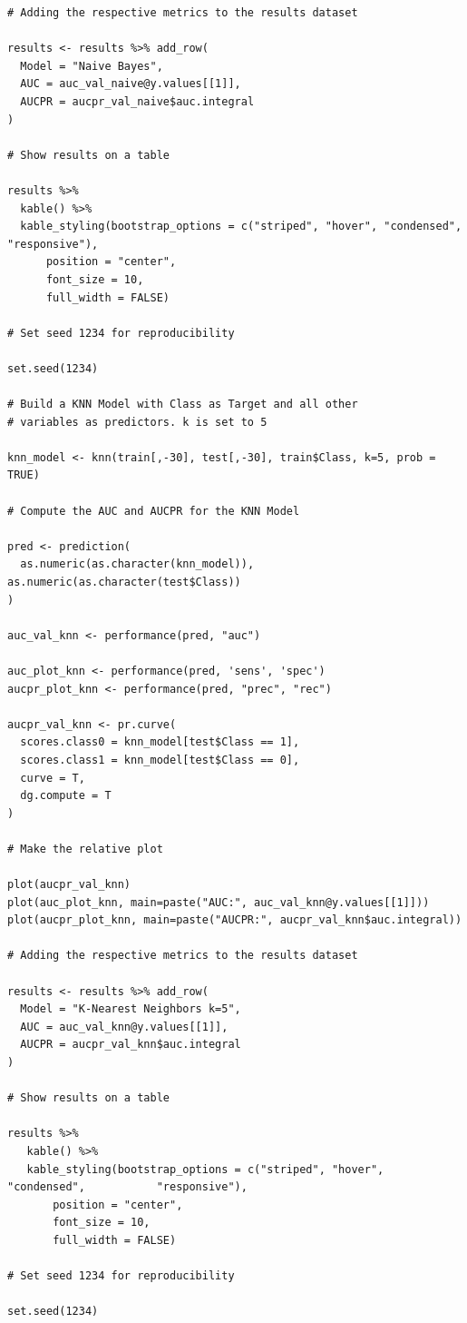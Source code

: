 \documentclass[]{article}
\begin{document}
\begin{verbatim}
# Adding the respective metrics to the results dataset

results <- results %>% add_row(
  Model = "Naive Bayes", 
  AUC = auc_val_naive@y.values[[1]],
  AUCPR = aucpr_val_naive$auc.integral
)

# Show results on a table

results %>%
  kable() %>%
  kable_styling(bootstrap_options = c("striped", "hover", "condensed",           "responsive"),
      position = "center",
      font_size = 10,
      full_width = FALSE) 
 
# Set seed 1234 for reproducibility

set.seed(1234)

# Build a KNN Model with Class as Target and all other
# variables as predictors. k is set to 5

knn_model <- knn(train[,-30], test[,-30], train$Class, k=5, prob = TRUE)

# Compute the AUC and AUCPR for the KNN Model

pred <- prediction(
  as.numeric(as.character(knn_model)),                                   as.numeric(as.character(test$Class))
)

auc_val_knn <- performance(pred, "auc")

auc_plot_knn <- performance(pred, 'sens', 'spec')
aucpr_plot_knn <- performance(pred, "prec", "rec")

aucpr_val_knn <- pr.curve(
  scores.class0 = knn_model[test$Class == 1], 
  scores.class1 = knn_model[test$Class == 0],
  curve = T,  
  dg.compute = T
)

# Make the relative plot

plot(aucpr_val_knn)
plot(auc_plot_knn, main=paste("AUC:", auc_val_knn@y.values[[1]]))
plot(aucpr_plot_knn, main=paste("AUCPR:", aucpr_val_knn$auc.integral))

# Adding the respective metrics to the results dataset

results <- results %>% add_row(
  Model = "K-Nearest Neighbors k=5", 
  AUC = auc_val_knn@y.values[[1]],
  AUCPR = aucpr_val_knn$auc.integral
)

# Show results on a table

results %>%
   kable() %>%
   kable_styling(bootstrap_options = c("striped", "hover", "condensed",           "responsive"),
       position = "center",
       font_size = 10,
       full_width = FALSE) 
 
# Set seed 1234 for reproducibility

set.seed(1234)


\end{verbatim}
\end{document}
